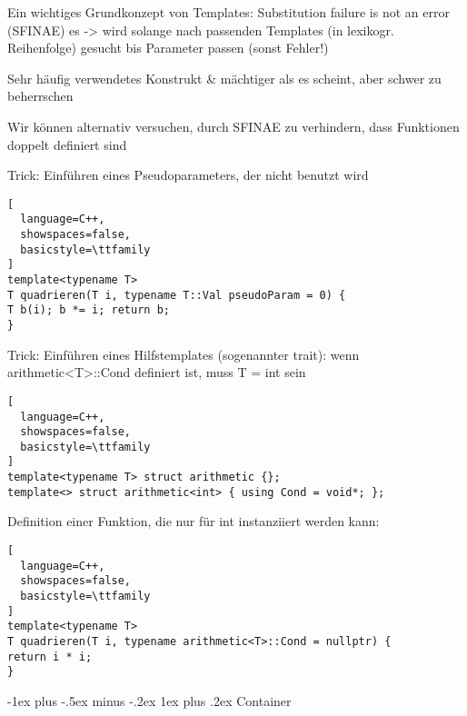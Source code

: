 \documentclass[10pt]{article}
\makeatletter
\renewcommand{\subsubsection}{\@startsection{subsubsection}{3}{0mm}%
                                {-1ex plus -.5ex minus -.2ex}%
                                {1ex plus .2ex}%
                                {\normalfont\small\bfseries}}
\makeatother
\begin{document}
\begin{itemize*}
\begin{itemize*}
  \item Ein wichtiges Grundkonzept von Templates: Substitution failure is not an error (SFINAE) es -> wird solange nach passenden Templates (in lexikogr. Reihenfolge) gesucht bis Parameter passen (sonst Fehler!)
  \item Sehr häufig verwendetes Konstrukt \& mächtiger als es scheint, aber schwer zu beherrschen
  \begin{itemize*}
    \item Wir können alternativ versuchen, durch SFINAE zu verhindern, dass Funktionen doppelt definiert sind
    \item Trick: Einführen eines Pseudoparameters, der nicht benutzt wird
    \begin{lstlisting}[
  language=C++,
  showspaces=false,
  basicstyle=\ttfamily
]
template<typename T>
T quadrieren(T i, typename T::Val pseudoParam = 0) {
T b(i); b *= i; return b;
}
\end{lstlisting}
    
    \item Trick: Einführen eines Hilfstemplates (sogenannter trait): wenn arithmetic<T>::Cond definiert ist, muss T = int sein
    \begin{lstlisting}[
  language=C++,
  showspaces=false,
  basicstyle=\ttfamily
]
template<typename T> struct arithmetic {};
template<> struct arithmetic<int> { using Cond = void*; };
\end{lstlisting}
    
    \item Definition einer Funktion, die nur für int instanziiert werden kann:
    \begin{lstlisting}[
  language=C++,
  showspaces=false,
  basicstyle=\ttfamily
]
template<typename T>
T quadrieren(T i, typename arithmetic<T>::Cond = nullptr) {
return i * i;
}
\end{lstlisting}
  \end{itemize*}
\end{itemize*}

\subsubsection{Container}


\end{itemize*}
\end{document}
